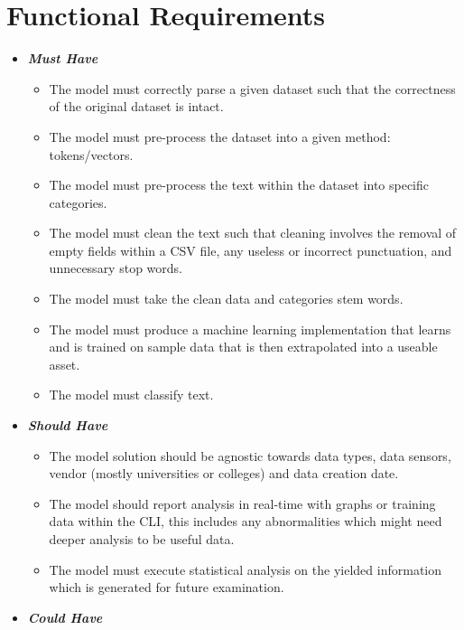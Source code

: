 \section{Functional Requirements} \label{section:FunctionalRequirements}
\begin{itemize}
    \item \textbf{\textit{Must Have}}
        \begin{itemize}\label{FMH}
            \item The model must correctly parse a given dataset such that the correctness of the original dataset is intact.
            \item The model must pre-process the dataset into a given method: tokens/vectors.
            \item The model must pre-process the text within the dataset into specific categories.
            \item The model must clean the text such that cleaning involves the removal of empty fields within a CSV file, any useless or incorrect punctuation, and unnecessary stop words.
            \item The model must take the clean data and categories stem words.
            \item The model must produce a machine learning implementation that learns and is trained on sample data that is then extrapolated into a useable asset.
            \item The model must classify text.
        \end{itemize}
    \item \textbf{\textit{Should Have}}
        \begin{itemize}\label{FSH}
            \item The model solution should be agnostic towards data types, data sensors, vendor (mostly universities or colleges) and data creation date.
            \item The model should report analysis in real-time with graphs or training data within the CLI, this includes any abnormalities which might need deeper analysis to be useful data.
            \item The model must execute statistical analysis on the yielded information which is generated for future examination.
        \end{itemize}
    \item \textbf{\textit{Could Have}}
        \begin{itemize}\label{FCH}

\end{itemize}
\end{itemize}
